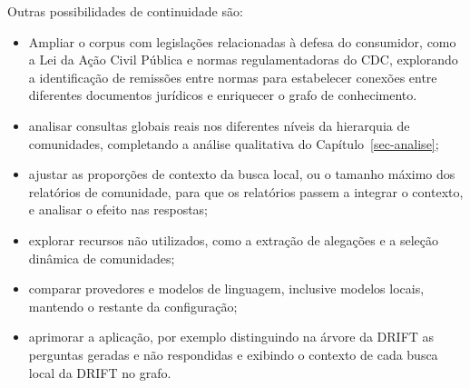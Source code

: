 Outras possibilidades de continuidade são:

\begin{itemize}
    \item Ampliar o corpus com legislações relacionadas à defesa do consumidor, como a Lei da Ação Civil Pública e normas regulamentadoras do CDC, explorando a identificação de remissões entre normas para estabelecer conexões entre diferentes documentos jurídicos e enriquecer o grafo de conhecimento.
    \item analisar consultas globais reais nos diferentes níveis da hierarquia de comunidades, completando a análise qualitativa do Capítulo~\ref{sec-analise};
    \item ajustar as proporções de contexto da busca local, ou o tamanho máximo dos relatórios de comunidade, para que os relatórios passem a integrar o contexto, e analisar o efeito nas respostas;
    \item explorar recursos não utilizados, como a extração de alegações e a seleção dinâmica de comunidades;
    \item comparar provedores e modelos de linguagem, inclusive modelos locais, mantendo o restante da configuração;
    \item aprimorar a aplicação, por exemplo distinguindo na árvore da DRIFT as perguntas geradas e não respondidas e exibindo o contexto de cada busca local da DRIFT no grafo.
\end{itemize}
